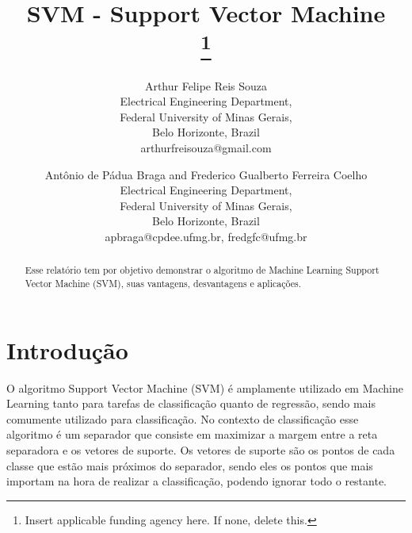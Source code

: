 \documentclass{article} %
\begin{document}
\title{SVM - Support Vector Machine\\
\thanks{Insert applicable funding agency here. If none, delete this.}
}

\author{Arthur Felipe Reis Souza \\
Electrical Engineering Department, \\
Federal University of Minas Gerais, \\
Belo Horizonte, Brazil \\
arthurfreisouza@gmail.com \\
\and
Antônio de Pádua Braga and Frederico Gualberto Ferreira Coelho \\
Electrical Engineering Department, \\
Federal University of Minas Gerais, \\
Belo Horizonte, Brazil \\
apbraga@cpdee.ufmg.br, fredgfc@ufmg.br
}

\maketitle

\begin{abstract}

    Esse relatório tem por objetivo demonstrar o algoritmo de Machine Learning Support Vector Machine (SVM), suas vantagens, desvantagens e aplicações.

\end{abstract}

\section{Introdução}

O algoritmo Support Vector Machine (SVM) é amplamente utilizado em Machine Learning tanto para tarefas de classificação quanto de regressão, sendo mais comumente utilizado para classificação. No contexto de classificação esse algoritmo é um separador que consiste em maximizar a margem entre a reta separadora e os vetores de suporte. Os vetores de suporte são os pontos de cada classe que estão mais próximos do separador, sendo eles os pontos que mais importam na hora de realizar a classificação, podendo ignorar todo o restante.

\vspace{1cm}
\end{document}
